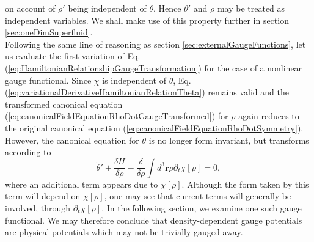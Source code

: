 \documentclass[twocolumn, nofootinbib, nobibnotes, amsmath,amssymb,aps, pra, floatfix]{revtex4-1}
\renewcommand{\v}[1]{\ensuremath{\mathbf{#1}}} %
\begin{document}
on account of $\rho'$ being independent of $\theta$.
Hence $\theta'$ and $\rho$ may be treated as independent variables.
We shall make use of this property further in section \ref{sec:oneDimSuperfluid}.\\
Following the same line of reasoning as section \ref{sec:externalGaugeFunctions}, let us evaluate the first variation of Eq. (\ref{eq:HamiltonianRelationshipGaugeTransformation}) for the case of a nonlinear gauge functional.
Since $\chi$ is independent of $\theta$, Eq. (\ref{eq:variationalDerivativeHamiltonianRelationTheta}) remains valid and the transformed canonical equation (\ref{eq:canonicalFieldEquationRhoDotGaugeTransformed}) for $\rho$ again reduces to the original canonical equation (\ref{eq:canonicalFieldEquationRhoDotSymmetry}).
However, the canonical equation for $\theta$ is no longer form invariant, but transforms according to
\begin{equation}
  \dot{\theta}'+\frac{\delta H}{\delta\rho}-\frac{\delta}{\delta\rho}\int d^3\v{r}\rho\partial_t\chi\left[ \rho \right]=0,
  \label{eq:canonicalFieldEquationThetaDotTransformedGaugeTransformedTwo}
\end{equation}
where an additional term appears due to $\chi\left[ \rho \right]$.
Although the form taken by this term will depend on $\chi\left[ \rho \right]$, one may see that current terms will generally be involved, through $\partial_t\chi\left[ \rho \right]$.
In the following section, we examine one such gauge functional.
We may therefore conclude that density-dependent gauge potentials are physical potentials which may not be trivially gauged away.
\end{document}
